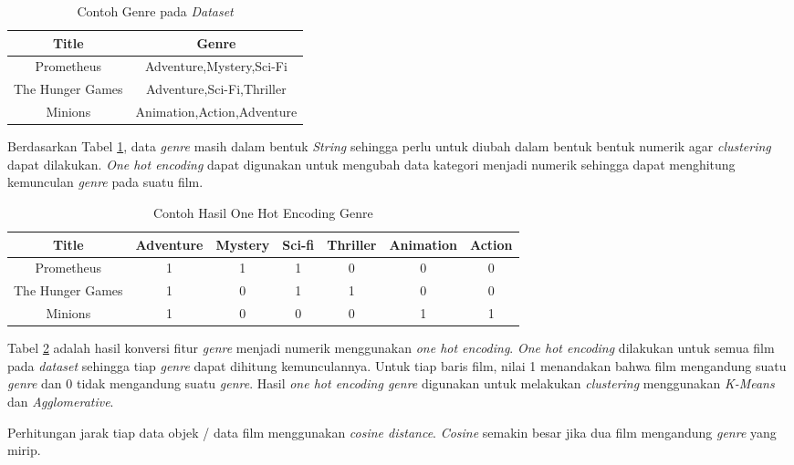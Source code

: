 \begin{table}[H]
\caption{Contoh Genre pada \textit{Dataset}}
\centering
\begin{tabular}{|c|c|}
\hline 
Title & Genre \\ 
\hline 
Prometheus
 & Adventure,Mystery,Sci-Fi
 \\ 
\hline 
The Hunger Games
 & Adventure,Sci-Fi,Thriller
 \\ 
\hline 
Minions
 & Animation,Action,Adventure
 \\ 
\hline 

\end{tabular} 
\label{tab:cluster_predatagenre}
\end{table}


Berdasarkan Tabel \ref{tab:cluster_predatagenre}, data \textit{genre} masih dalam bentuk \textit{String} sehingga perlu untuk diubah dalam bentuk bentuk numerik agar \textit{clustering} dapat dilakukan. \textit{One hot encoding} dapat digunakan untuk mengubah data kategori menjadi numerik sehingga dapat menghitung kemunculan \textit{genre} pada suatu film.


\begin{table}[H]
\centering
\caption{Contoh Hasil One Hot Encoding Genre}
\begin{tabular}{|c|c|c|c|c|c|c|}
\hline 
Title & Adventure & Mystery & Sci-fi & Thriller & Animation & Action  \\ 
\hline 
Prometheus & 1 & 1 & 1 & 0 & 0 & 0  \\ 
\hline 
The Hunger Games & 1 & 0 & 1 & 1 & 0 & 0  \\ 
\hline 
Minions & 1 & 0 & 0 & 0 & 1 & 1  \\ 
\hline 

\end{tabular} 
\label{tab:cluster_hasilonehotencodinggenre}
\end{table}

Tabel \ref{tab:cluster_hasilonehotencodinggenre} adalah hasil konversi fitur \textit{genre} menjadi numerik menggunakan \textit{one hot encoding}. \textit{One hot encoding} dilakukan untuk semua film pada \textit{dataset} sehingga tiap \textit{genre} dapat dihitung kemunculannya. Untuk tiap baris film, nilai 1 menandakan bahwa film mengandung suatu \textit{genre} dan 0 tidak mengandung suatu \textit{genre}. Hasil \textit{ one hot encoding genre} digunakan untuk melakukan \textit{clustering} menggunakan \textit{K-Means} dan \textit{Agglomerative}.

 Perhitungan jarak tiap data objek / data film menggunakan \textit{cosine distance}. \textit{Cosine} semakin besar jika dua film mengandung \textit{genre} yang mirip.   

